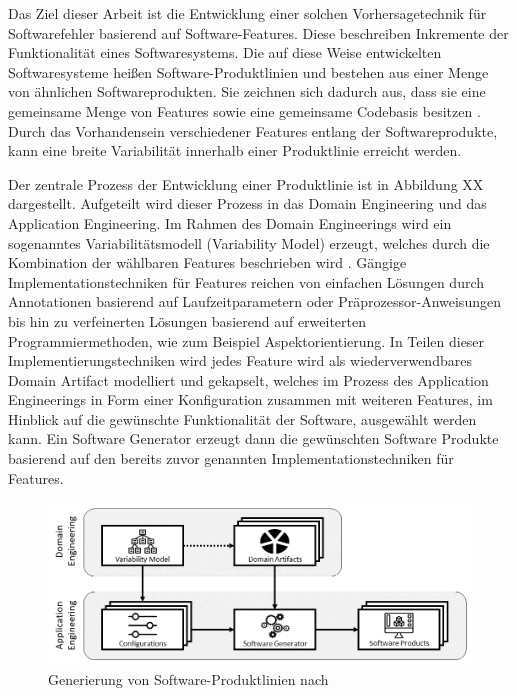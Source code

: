 Das Ziel dieser Arbeit ist die Entwicklung einer solchen Vorhersagetechnik für Softwarefehler basierend auf Software-Features. Diese beschreiben Inkremente der Funktionalität eines Softwaresystems. Die auf diese Weise entwickelten Softwaresysteme heißen Software-Produktlinien und bestehen aus einer Menge von ähnlichen Softwareprodukten. Sie zeichnen sich dadurch aus, dass sie eine gemeinsame Menge von Features sowie eine gemeinsame Codebasis besitzen \cite{Thuem2014}. Durch das Vorhandensein verschiedener Features entlang der Softwareprodukte, kann eine breite Variabilität innerhalb einer Produktlinie erreicht werden. 

Der zentrale Prozess der Entwicklung einer Produktlinie ist in Abbildung XX dargestellt. Aufgeteilt wird dieser Prozess in das Domain Engineering und das Application Engineering. Im Rahmen des Domain Engineerings wird ein sogenanntes Variabilitätsmodell (Variability Model) erzeugt, welches durch die Kombination der wählbaren Features beschrieben wird \cite{Apel2013}. Gängige Implementationstechniken für Features reichen von einfachen Lösungen durch Annotationen basierend auf Laufzeitparametern oder Präprozessor-Anweisungen bis hin zu verfeinerten Lösungen basierend auf erweiterten Programmiermethoden, wie zum Beispiel Aspektorientierung. In Teilen dieser Implementierungstechniken wird jedes Feature wird als wiederverwendbares Domain Artifact modelliert und gekapselt, welches im Prozess des Application Engineerings in Form einer Konfiguration zusammen mit weiteren Features, im Hinblick auf die gewünschte Funktionalität der Software, ausgewählt werden kann. Ein Software Generator erzeugt dann die gewünschten Software Produkte basierend auf den bereits zuvor genannten Implementationstechniken für Features.

\begin{figure}[H]
    \centering
    \includegraphics[width=\textwidth]{images/SPL}
    \caption{Generierung von Software-Produktlinien nach \cite{Thuem2014}\label{fig:spl}}
\end{figure}
 
